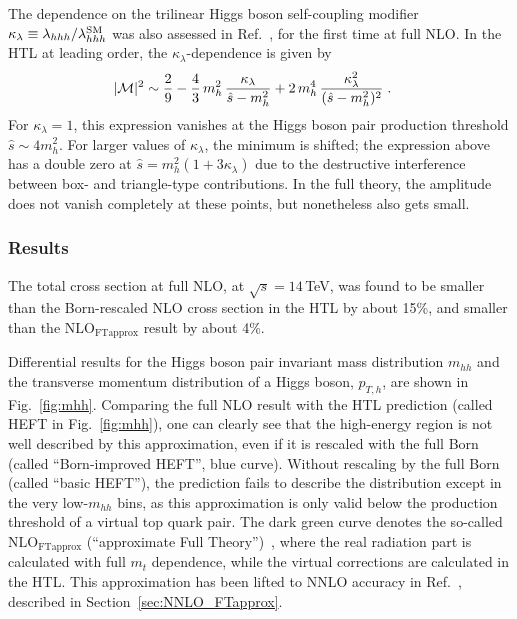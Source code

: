 The dependence on the trilinear Higgs boson self-coupling modifier
$\kappa_\lambda \equiv \lambda_{hhh}/\lambda_{hhh}^{\rm SM}$
was also assessed in Ref.~\cite{Borowka:2016ypz}, for the first time
at full NLO.
In the HTL at leading order, the $\kappa_\lambda$-dependence is
given by
\begin{align}
|{\cal M}|^2&\sim  \frac{2}{9} -  \frac{4}{3}\,m_h^2\,\frac{\kappa_\lambda}{\hat{s}-m_h^2} +
  2\,m_h^4\,\frac{\kappa_\lambda^2}{(\hat{s}-m_h^2)^2}\;.\label{eq:loheft}
\end{align}
For $\kappa_\lambda=1$, this expression vanishes at the Higgs boson pair production threshold
$\hat{s} \sim 4 m_h^2$. For larger values of $\kappa_\lambda$, the minimum is
shifted; the expression above has a double zero at
$\hat{s}=m_h^2(1+3\kappa_\lambda)$ due to the destructive interference between box- and
triangle-type contributions.
In the full theory, the amplitude does not vanish completely at these points,
but nonetheless also gets small.

\subsubsection{Results}
The total cross section at full NLO, at $\sqrt{s}=14$\,TeV, was found to be smaller than the Born-rescaled NLO cross section in the HTL by about 15\%, and smaller than the $\mathrm{NLO}_{\mathrm{FTapprox}}$ result by about 4\%.

Differential results for the Higgs boson pair invariant mass distribution $m_{hh}$ and the transverse momentum distribution of a Higgs boson, $p_{T,h}$, are shown in Fig.~\ref{fig:mhh}.
Comparing the full NLO result with the HTL prediction (called HEFT in Fig.~\ref{fig:mhh}), one can clearly see that the high-energy region is not well described by this approximation, even if it is rescaled with the full Born (called ``Born-improved HEFT'', blue curve). Without rescaling by the full Born (called ``basic HEFT''), the prediction fails to describe the distribution except in the very low-$m_{hh}$ bins, as this approximation is only valid below the production threshold of a virtual top quark pair. The dark green curve denotes the so-called $\mathrm{NLO}_{\mathrm{FTapprox}}$ (``approximate Full Theory'')~\cite{Maltoni:2014eza}, where the real radiation part is calculated with full $m_t$ dependence, while the virtual corrections are calculated in the HTL. This approximation has been lifted to NNLO accuracy in Ref.~\cite{Grazzini:2018bsd}, described in Section~\ref{sec:NNLO_FTapprox}.


